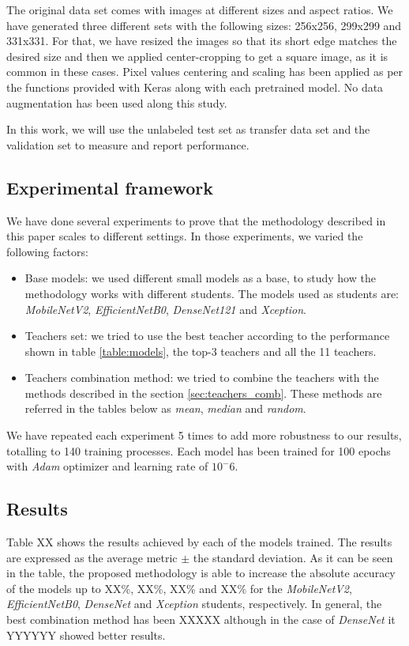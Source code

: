 \documentclass{elsarticle}
\begin{document}
	The original data set comes with images at different sizes and aspect ratios. We have generated three different sets with the following sizes: 256x256, 299x299 and 331x331. For that, we have resized the images so that its short edge matches the desired size and then we applied center-cropping to get a square image, as it is common in these cases. Pixel values centering and scaling has been applied as per the functions provided with Keras along with each pretrained model. No data augmentation has been used along this study.
	
	In this work, we will use the unlabeled test set as transfer data set and the validation set to measure and report performance. 
	
	\subsection{Experimental framework}
	We have done several experiments to prove that the methodology described in this paper scales to different settings. In those experiments, we varied the following factors:
	
	\begin{itemize}
		\item Base models: we used different small models as a base, to study how the methodology works with different students. The models used as students are: \textit{MobileNetV2}, \textit{EfficientNetB0}, \textit{DenseNet121} and \textit{Xception}.
		\item Teachers set: we tried to use the best teacher according to the performance shown in table \ref{table:models}, the top-3 teachers and all the 11 teachers.
		\item Teachers combination method: we tried to combine the teachers with the methods described in the section \ref{sec:teachers_comb}. These methods are referred in the tables below as \textit{mean}, \textit{median} and \textit{random}.
	\end{itemize}
		
	We have repeated each experiment 5 times to add more robustness to our results, totalling to 140 training processes. Each model has been trained for 100 epochs with \textit{Adam} optimizer \cite{Kingma14} and learning rate of $10^-6$. 
		
	\subsection{Results}
	Table XX shows the results achieved by each of the models trained. The results are expressed as the average metric $\pm$ the standard deviation. As it can be seen in the table, the proposed methodology is able to increase the absolute accuracy of the models up to XX\%, XX\%, XX\% and XX\% for the \textit{MobileNetV2}, \textit{EfficientNetB0}, \textit{DenseNet} and \textit{Xception} students, respectively. In general, the best combination method has been XXXXX although in the case of \textit{DenseNet} it YYYYYY showed better results. 
	
\end{document}

